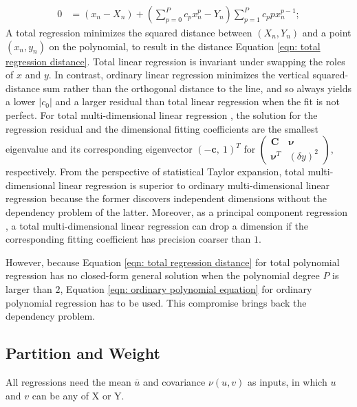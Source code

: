 \documentclass[twoside]{article}
\numberwithin{equation}{section}
\begin{document}
\begin{align}
\label{eqn: total regression distance}
0 &= (x_n - X_n) + \left( \sum_{p=0}^{P} c_p x_n^p -  Y_n \right) \sum_{p=1}^{P} c_p p x_n^{p - 1}; 
\end{align}
A total regression \cite{Linear_Regression} minimizes the squared distance between $(X_n, Y_n)$ and a point $(x_n, y_n)$ on the polynomial, to result in the distance Equation \eqref{eqn: total regression distance}. 
Total linear regression is invariant under swapping the roles of $x$ and $y$.
In contrast, ordinary linear regression minimizes the vertical squared-distance sum rather than the orthogonal distance to the line, and so always yields a lower $|c_0|$ and a larger residual than total linear regression when the fit is not perfect.
For total multi-dimensional linear regression \cite{Linear_Regression}, the solution for the regression residual and the dimensional fitting coefficients are the smallest eigenvalue and its corresponding eigenvector  $(-\mathbf{c},\ 1)^T$ for $\begin{pmatrix} \mathbf{C} & \boldsymbol{\nu} \\ \boldsymbol{\nu}^T & (\delta y)^2 \end{pmatrix}$, respectively.
From the perspective of statistical Taylor expansion, total multi-dimensional linear regression is superior to ordinary multi-dimensional linear regression because the former discovers independent dimensions without the dependency problem of the latter.
Moreover, as a principal component regression \cite{Linear_Algebra}, a total multi-dimensional linear regression can drop a dimension if the corresponding fitting coefficient has precision coarser than $1$.

However, because Equation \eqref{eqn: total regression distance} for total polynomial regression has no closed-form general solution when the polynomial degree $P$ is larger than $2$, Equation \eqref{eqn: ordinary polynomial equation} for ordinary polynomial regression has to be used.
This compromise brings back the dependency problem.



\subsection{Partition and Weight}

All regressions need the mean $\overline{u}$ and covariance $\nu(u, v)$ as inputs, in which $u$ and $v$ can be any of X or Y.
\end{document}
